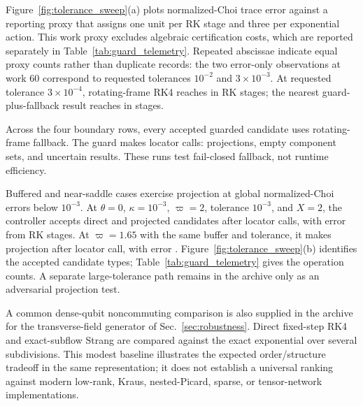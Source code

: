 Figure~\ref{fig:tolerance_sweep}(a) plots normalized-Choi trace error against a reporting proxy that assigns one unit per RK stage and three per exponential action. This work proxy excludes algebraic certification costs, which are reported separately in Table~\ref{tab:guard_telemetry}. Repeated abscissae indicate equal proxy counts rather than duplicate records: the two error-only observations at work 60 correspond to requested tolerances $10^{-2}$ and $3\times10^{-3}$. At requested tolerance $3\times10^{-4}$, rotating-frame RK4 reaches \BenchmarkRotatingError{} in \BenchmarkRotatingStages{} RK stages; the nearest guard-plus-fallback result reaches \BenchmarkNearestGuardError{} in \BenchmarkNearestGuardStages{} stages.

Across the four boundary rows, every accepted guarded candidate uses rotating-frame fallback. The guard makes \BenchmarkGuardLocatorCalls{} locator calls: \BenchmarkGuardSuccessfulProjections{} projections, \BenchmarkGuardEmptyComponents{} empty component sets, and \BenchmarkGuardUncertainOutcomes{} uncertain results. These runs test fail-closed fallback, not runtime efficiency.

Buffered and near-saddle cases exercise projection at global normalized-Choi errors below $10^{-3}$. At $\theta=0$, $\kappa=10^{-3}$, $\varpi=2$, tolerance $10^{-3}$, and $X=2$, the controller accepts \BenchmarkBufferedDirect{} direct and \BenchmarkBufferedProjected{} projected candidates after \BenchmarkBufferedLocatorCalls{} locator calls, with error \BenchmarkBufferedError{} from \BenchmarkBufferedStages{} RK stages. At $\varpi=1.65$ with the same buffer and tolerance, it makes \BenchmarkNearSaddleProjected{} projection after \BenchmarkNearSaddleLocatorCalls{} locator call, with error \BenchmarkNearSaddleError{}. Figure~\ref{fig:tolerance_sweep}(b) identifies the accepted candidate types; Table~\ref{tab:guard_telemetry} gives the operation counts. A separate large-tolerance path remains in the archive only as an adversarial projection test.

A common dense-qubit noncommuting comparison is also supplied in the archive for the transverse-field generator of Sec.~\ref{sec:robustness}. Direct fixed-step RK4 and exact-subflow Strang are compared against the exact exponential over several subdivisions. This modest baseline illustrates the expected order/structure tradeoff in the same representation; it does not establish a universal ranking against modern low-rank, Kraus, nested-Picard, sparse, or tensor-network implementations.

